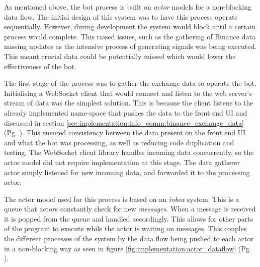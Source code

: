\noindent As mentioned above, the bot process is built on \textit{actor} models for a non-blocking data flow. The initial design of this system was to have this process operate sequentially. However, during development the system would block until a certain process would complete. This raised issues, such as the gathering of Binance data missing updates as the intensive process of generating signals was being executed. This meant crucial data could be potentially missed which would lower the effectiveness of the bot.

The first stage of the process was to gather the exchange data to operate the bot. Initialising a WebSocket client that would connect and listen to the web server's stream of data was the simplest solution. This is because the client listens to the already implemented name-space that pushes the data to the front end UI and discussed in section \ref{sec:implementation:info_comm:binance_exchange_data} (Pg. \pageref{sec:implementation:info_comm:binance_exchange_data}). This ensured consistency between the data present on the front end UI and what the bot was processing, as well as reducing code duplication and testing. The WebSocket client library handles incoming data concurrently, so the actor model did not require implementation at this stage. The data gatherer actor simply listened for new incoming data, and forwarded it to the processing actor.

The actor model used for this process is based on an \textit{inbox} system. This is a queue that actors constantly check for new \textit{messages}. When a message is received it is popped from the queue and handled accordingly. This allows for other parts of the program to execute while the actor is waiting on messages. This couples the different processes of the system by the data flow being pushed to each actor in a non-blocking way as seen in figure \ref{fig:implementation:actor_dataflow} (Pg. \pageref{fig:implementation:actor_dataflow}). 

